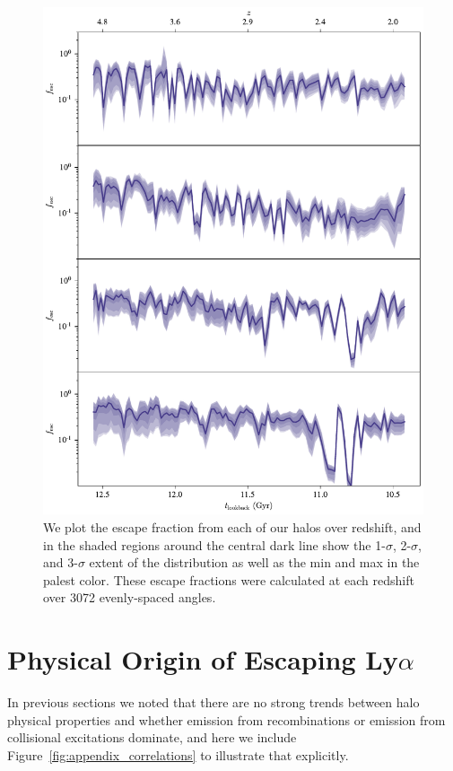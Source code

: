 \begin{figure}
    \centering
    \includegraphics[width=\textwidth,height=0.85\textheight,keepaspectratio]{figures/los.pdf}
    \caption{
        We plot the escape fraction from each of our halos over redshift, and in the shaded regions around the central dark line show the 1-$\sigma$, 2-$\sigma$, and 3-$\sigma$ extent of the distribution as well as the min and max in the palest color.
        These escape fractions were calculated at each redshift over 3072 evenly-spaced angles.
    }
    \label{fig:los}
\end{figure}

\section{Physical Origin of Escaping Ly\texorpdfstring{$\alpha$}{a}}
\label{sec:correlations}

In previous sections we noted that there are no strong trends between halo physical properties and whether emission from recombinations or emission from collisional excitations dominate, and here we include Figure~\ref{fig:appendix_correlations} to illustrate that explicitly.

